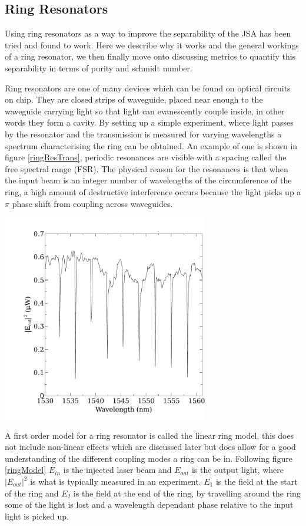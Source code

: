\subsection{Ring Resonators}
Using ring resonators as a way to improve the separability of the JSA has been tried and found to work. Here we describe why it works and the general workings of a ring resonator, we then finally move onto discussing metrics to quantify this separability in terms of purity and schmidt number.


Ring resonators are one of many devices which can be found on optical circuits on chip. They are closed strips of waveguide, placed near enough to the waveguide carrying light so that light can evanescently couple inside, in other words they form a cavity. By setting up a simple experiment, where light passes by the resonator and the transmission is measured for varying wavelengths a spectrum characterising the ring can be obtained. An example of one is shown in figure \ref{ringResTrans}, periodic resonances are visible with a spacing called the free spectral range (FSR). The physical reason for the resonances is that when the input beam is an integer number of wavelengths of the circumference of the ring, a high amount of destructive interference occurs because the light picks up a $\pi$ phase shift from coupling across waveguides.

\begingroup
\centering
    \includegraphics[width=9cm]{img/theory/ringTransmission.pdf}
 \label{ringResTrans}
\endgroup


A first order model for a ring resonator is called the linear ring model, this does not include non-linear effects which are discussed later but does allow for a good understanding of the different coupling modes a ring can be in. Following figure \ref{ringModel} $E_{in}$ is the injected laser beam and $E_{out}$ is the output light, where $|E_{out}|^2$ is what is typically measured in an experiment. $E_{1}$ is the field at the start of the ring and $E_2$ is the field at the end of the ring, by travelling around the ring some of the light is lost and a wavelength dependant phase relative to the input light is picked up.

